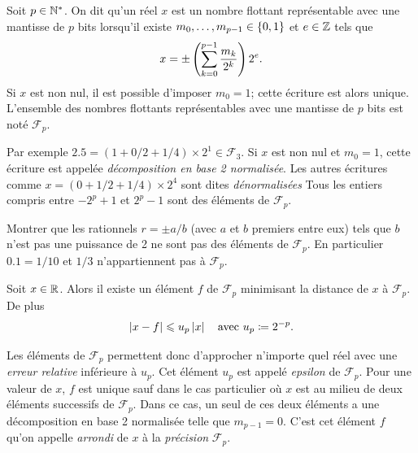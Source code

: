\documentclass{magnoliaold}
\begin{document}


\begin{definition}
Soit $p\in{\mathbb{N}^*}$. On dit qu'un réel $x$ est un nombre flottant représentable avec une mantisse de $p$ bits lorsqu'il existe $m_0,\ldots,m_{p-1}\in\left\{0,1\right\}$ et $e\in\mathbb{Z}$ tels que
\[x=\pm\left(\sum_{k=0}^{p-1} \frac{m_k}{2^k}\right)2^e.\]
Si $x$ est non nul, il est possible d'imposer $m_0=1$; cette écriture est alors unique. L'ensemble des nombres flottants représentables avec une mantisse de $p$ bits est noté $\mathcal{F}_p$.  
\end{definition}

\begin{remarques}
\remarque 
  Par exemple $2.5=(1+0/2+1/4)\times 2^1\in\mathcal{F}_3$.
\remarque Si $x$ est non nul et $m_0=1$, cette écriture est appelée
  \emph{décomposition en base 2 normalisée}. Les autres écritures comme
  $x = (0 + 1/2 + 1/4)\times 2^4$ sont dites \emph{dénormalisées}
\remarque Tous les entiers compris entre $-2^p+1$ et $2^p-1$ sont des éléments de $\mathcal{F}_p$.
\end{remarques}

\begin{exoUnique}
\exo Montrer que les rationnels $r=\pm a/b$ (avec $a$ et $b$ premiers entre eux) tels que $b$ n'est pas une puissance de 2 ne sont pas des éléments de $\mathcal{F}_p$. En particulier $0.1=1/10$ et $1/3$ n'appartiennent pas à $\mathcal{F}_p$.
\end{exoUnique}



\begin{proposition}
  Soit $x\in\mathbb{R}$. Alors il existe un élément $f$ de $\mathcal{F}_p$ minimisant la distance de $x$ à $\mathcal{F}_p$. De plus
  \[\left|x-f\right|\leqslant u_p\left|x\right| \quad\text{avec $u_p\coloneqq 2^{-p}$}.\]
  \end{proposition}

\begin{remarques}
\remarque Les éléments de $\mathcal{F}_p$ permettent donc d'approcher
  n'importe quel réel avec une \emph{erreur relative} inférieure à $u_p$. Cet
  élément $u_p$ est appelé \emph{epsilon} de $\mathcal{F}_p$.
\remarque Pour une valeur de $x$, $f$ est unique sauf dans le cas particulier où $x$
  est au milieu de deux éléments successifs de $\mathcal{F}_p$. Dans ce cas, un seul de
  ces deux éléments a une décomposition en base 2 normalisée telle que $m_{p-1}=0$.
  C'est cet élément $f$ qu'on appelle \emph{arrondi} de $x$ à la \emph{précision}
  $\mathcal{F}_p$.
\end{remarques}
\end{document}
